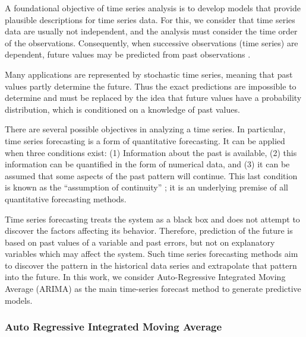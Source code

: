 A foundational objective of time series analysis is to develop models that provide plausible descriptions for time series data. For this, we consider that time series data are usually not independent, and the analysis must consider the time order of the observations. Consequently, when successive observations (time series) are dependent, future values may be predicted from past observations \cite{Mills2019}. 

Many applications are represented by stochastic time series, meaning that past values partly determine the future. Thus the exact predictions are impossible to determine and must be replaced by the idea that future values have a probability distribution, which is conditioned on a knowledge of past values. 

There are several possible objectives in analyzing a time series. In particular, time series forecasting is a form of quantitative forecasting. It can be applied when three conditions exist: (1) Information about the past is available, (2) this information can be quantified in the form of numerical data, and (3) it can be assumed that some aspects of the past pattern will continue. This last condition is known as the ``assumption of continuity'' \cite{Makridakis2008}; it is an underlying premise of all quantitative forecasting methods. 

Time series forecasting treats the system as a black box and does not attempt to discover the factors affecting its behavior. Therefore, prediction of the future is based on past values of a variable and past errors, but not on explanatory variables which may affect the system. Such time series forecasting methods aim to discover the pattern in the historical data series and extrapolate that pattern into the future. 
In this work, we consider Auto-Regressive Integrated Moving Average (ARIMA) as the main time-series forecast method to generate predictive models.

\subsubsection{Auto Regressive Integrated Moving Average}
\label{Sec:TheoryARIMA}

